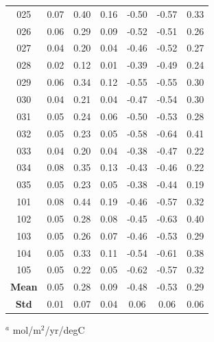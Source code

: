 \documentclass[12pt]{article}
\begin{document}
\begin{table}[!h]
\begin{tabular}{c c c c | c c c}
	025 &   0.07 &     0.40 &       0.16 &  -0.50 &    -0.57 &       0.33 \\
	026 &   0.06 &     0.29 &       0.09 &  -0.52 &    -0.51 &       0.26 \\
	027 &   0.04 &     0.20 &       0.04 &  -0.46 &    -0.52 &       0.27 \\
	028 &   0.02 &     0.12 &       0.01 &  -0.39 &    -0.49 &       0.24 \\
	029 &   0.06 &     0.34 &       0.12 &  -0.55 &    -0.55 &       0.30 \\
	030 &   0.04 &     0.21 &       0.04 &  -0.47 &    -0.54 &       0.30 \\
	031 &   0.05 &     0.24 &       0.06 &  -0.50 &    -0.53 &       0.28 \\
	032 &   0.05 &     0.23 &       0.05 &  -0.58 &    -0.64 &       0.41 \\
	033 &   0.04 &     0.20 &       0.04 &  -0.38 &    -0.47 &       0.22 \\
	034 &   0.08 &     0.35 &       0.13 &  -0.43 &    -0.46 &       0.22 \\
	035 &   0.05 &     0.23 &       0.05 &  -0.38 &    -0.44 &       0.19 \\
	101 &   0.08 &     0.44 &       0.19 &  -0.46 &    -0.57 &       0.32 \\
	102 &   0.05 &     0.28 &       0.08 &  -0.45 &    -0.63 &       0.40 \\
	103 &   0.05 &     0.26 &       0.07 &  -0.46 &    -0.53 &       0.29 \\
	104 &   0.05 &     0.33 &       0.11 &  -0.54 &    -0.61 &       0.38 \\
	105 &   0.05 &     0.22 &       0.05 &  -0.62 &    -0.57 &       0.32 \\
	\bottomrule
	\textbf{Mean} & 0.05 & 0.28 & 0.09 & -0.48 & -0.53 & 0.29 \\
	\textbf{Std} & 0.01 & 0.07 & 0.04 & 0.06 & 0.06 & 0.06
\end{tabular}
\begin{tablenotes}
	\centering
	\item $^{a}$ mol/m$^{2}$/yr/degC
\end{tablenotes}
\label{tab:enso-pacific}
\end{table}
\end{document}

